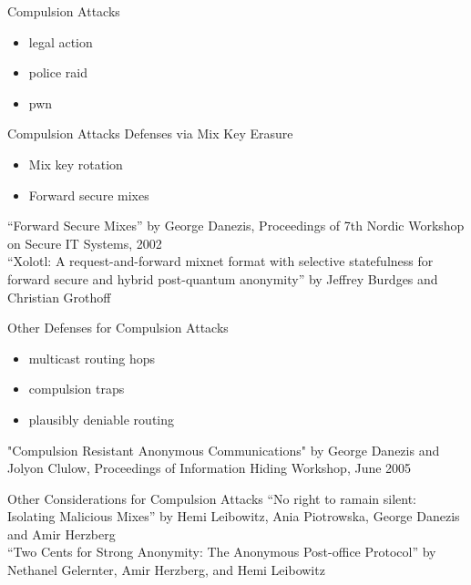 \documentclass[fleqn,xcolor={usenames,dvipsnames}]{beamer} %
\begin{document}
\begin{frame}{Compulsion Attacks}
\begin{center}
  \vspace{5mm}
  \begin{itemize}
  \item legal action
  \item police raid
  \item pwn
  \end{itemize}  
\end{center}
\end{frame}

\begin{frame}{Compulsion Attacks Defenses via Mix Key Erasure}
\begin{center}
  \begin{itemize}
  \item Mix key rotation
  \item Forward secure mixes
  \end{itemize}  
\end{center}

\vspace{10mm}
``Forward Secure Mixes'' by George Danezis,
Proceedings of 7th Nordic Workshop on Secure IT Systems, 2002\\
\vspace{5mm}
``Xolotl: A request-and-forward mixnet format with selective statefulness for forward
secure and hybrid post-quantum anonymity'' by Jeffrey Burdges and Christian Grothoff

\end{frame}

\begin{frame}{Other Defenses for Compulsion Attacks}
\begin{center}
  \begin{itemize}
  \item multicast routing hops
  \item compulsion traps
  \item plausibly deniable routing
  \end{itemize}  
\end{center}

\vspace{5mm} %

"Compulsion Resistant Anonymous Communications" by George Danezis and Jolyon Clulow,
Proceedings of Information Hiding Workshop, June 2005
\end{frame}


\begin{frame}{Other Considerations for Compulsion Attacks}
\vspace{5mm} %
``No right to ramain silent: Isolating Malicious Mixes''
by Hemi Leibowitz, Ania Piotrowska, George Danezis and Amir Herzberg\\
\vspace{10mm}
``Two Cents for Strong Anonymity: The Anonymous Post-office Protocol''
by Nethanel Gelernter, Amir Herzberg, and Hemi Leibowitz
\end{frame}
\end{document}
